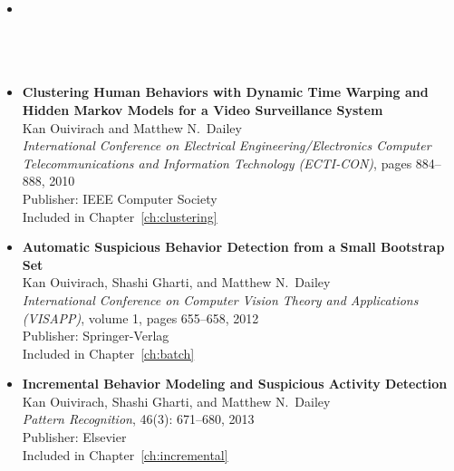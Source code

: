 \begin{itemize}
  \renewcommand\labelitemi{--} 

  \item {}\\ \ \\ \textit{}\\ 
    \\ 

  \item \DIFaddend \textbf{Clustering Human Behaviors with Dynamic Time Warping
    and Hidden Markov Models for a Video Surveillance
    System}\nocite{kan10clustering}\\ Kan Ouivirach and Matthew N.\
    Dailey\\ \textit{International Conference on Electrical
    Engineering/Electronics Computer Telecommunications and
    Information Technology (ECTI-CON)}, pages 884--888, 2010\\
    Publisher: IEEE Computer Society\\ Included in
    Chapter~\ref{ch:clustering}\\

  \item \textbf{Automatic Suspicious Behavior Detection from a Small
    Bootstrap Set}\nocite{kan12detection}\\ Kan Ouivirach, Shashi
    Gharti, and Matthew N.\ Dailey\\ \textit{International Conference
    on Computer Vision Theory and Applications (VISAPP)}, volume 1,
    pages 655--658, 2012\\ Publisher: Springer-Verlag\\ Included in
    Chapter~\ref{ch:batch}\\

  \item \textbf{Incremental Behavior Modeling and Suspicious Activity
    Detection}\nocite{kan13incremental}\\ Kan Ouivirach, Shashi
    Gharti, and Matthew N.\ Dailey\\ \textit{Pattern Recognition},
    46(3): 671--680, 2013\\ Publisher: Elsevier\\ Included in
    Chapter~\ref{ch:incremental}
  

\end{itemize}
